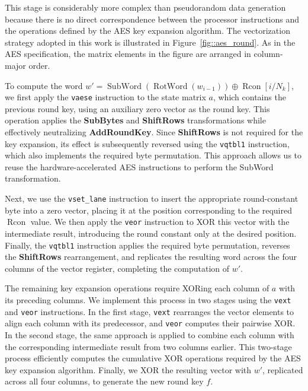 This stage is considerably more complex than pseudorandom data generation because there is no direct correspondence between the processor instructions and the operations defined by the AES key expansion algorithm. The vectorization strategy adopted in this work is illustrated in Figure~\ref{fig::aes_round}. As in the AES specification, the matrix elements in the figure are arranged in column-major order.

To compute the word \(w' = \operatorname{SubWord}(\operatorname{RotWord}(w_{i-1})) \oplus \operatorname{Rcon}[i/N_k]\), we first apply the \texttt{vaese} instruction to the state matrix \(a\), which contains the previous round key, using an auxiliary zero vector as the round key. This operation applies the \textbf{SubBytes} and \textbf{ShiftRows} transformations while effectively neutralizing \textbf{AddRoundKey}. Since \textbf{ShiftRows} is not required for the key expansion, its effect is subsequently reversed using the \texttt{vqtbl1} instruction, which also implements the required byte permutation. This approach allows us to reuse the hardware-accelerated AES instructions to perform the SubWord transformation.

Next, we use the \texttt{vset\_lane} instruction to insert the appropriate round-constant byte into a zero vector, placing it at the position corresponding to the required \(\operatorname{Rcon}\) value. We then apply the \texttt{veor} instruction to XOR this vector with the intermediate result, introducing the round constant only at the desired position. Finally, the \texttt{vqtbl1} instruction applies the required byte permutation, reverses the \textbf{ShiftRows} rearrangement, and replicates the resulting word across the four columns of the vector register, completing the computation of \(w'\).

The remaining key expansion operations require XORing each column of \(a\) with its preceding columns. We implement this process in two stages using the \texttt{vext} and \texttt{veor} instructions. In the first stage, \texttt{vext} rearranges the vector elements to align each column with its predecessor, and \texttt{veor} computes their pairwise XOR. In the second stage, the same approach is applied to combine each column with the corresponding intermediate result from two columns earlier. This two-stage process efficiently computes the cumulative XOR operations required by the AES key expansion algorithm. Finally, we XOR the resulting vector with \(w'\), replicated across all four columns, to generate the new round key \(f\).

